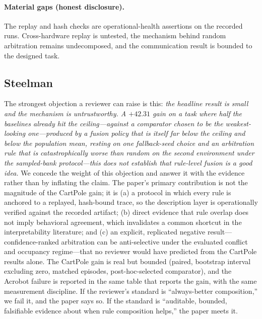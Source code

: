 \documentclass[11pt]{article}
\begin{document}
\paragraph{Material gaps (honest disclosure).}
The replay and hash checks are operational-health assertions on the recorded runs.
Cross-hardware replay is untested, the mechanism behind random arbitration remains undecomposed,
and the communication result is bounded to the designed task.


\subsection{Steelman}
\label{sec:discussion:steelman}

The strongest objection a reviewer can raise is this: \emph{the headline result is small and the
mechanism is untrustworthy. A $+42.31$ gain on a task where half the baselines already hit the
ceiling---against a comparator chosen to be the weakest-looking one---produced by a fusion policy that
is itself far below the ceiling and below the population mean, resting on one
fallback-seed choice and an arbitration rule that is catastrophically worse than random on the
second environment \emph{under the sampled-bank protocol}---this does not establish that rule-level
fusion is a good idea.} We concede the
weight of this objection and answer it with the evidence rather than by inflating the claim. The
paper's primary contribution is not the magnitude of the CartPole gain; it is (a) a protocol in
which every rule is anchored to a replayed, hash-bound trace, so the description layer is
operationally verified against the recorded artifact; (b) direct evidence that rule overlap does not imply behavioral agreement, which
invalidates a common shortcut in the interpretability literature; and (c) an explicit, replicated
negative result---confidence-ranked arbitration can be anti-selective under the evaluated conflict and
occupancy regime---that no reviewer would have
predicted from the CartPole results alone. The CartPole gain is real but bounded (paired, bootstrap
interval excluding zero, matched episodes, post-hoc-selected comparator), and the Acrobot failure is
reported in the same table
that reports the gain, with the same measurement discipline. If the reviewer's standard is
``always-better composition,'' we fail it, and the paper says so. If the standard is ``auditable,
bounded, falsifiable evidence about when rule composition helps,'' the paper meets it.
\end{document}
